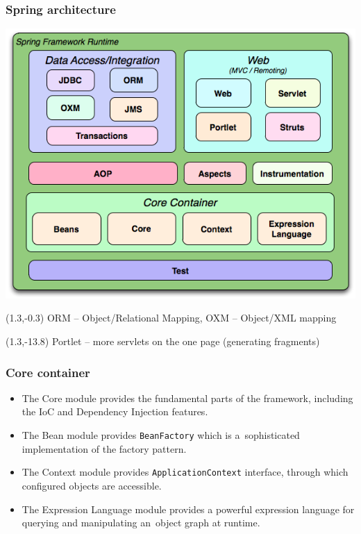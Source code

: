 \documentclass[10pt,xcolor=pdflatex, table]{beamer}
\begin{document}
\begin{frame}\frametitle{Spring architecture}
\begin{center}
  \includegraphics[scale=0.5]{img/obr1}
\end{center}
\begin{textblock}{15}(1.3,-0.3)
    {\footnotesize ORM -- Object/Relational Mapping, OXM -- Object/XML mapping}
\end{textblock}
\begin{textblock}{15}(1.3,-13.8)
    {\footnotesize Portlet -- more servlets on the one page (generating fragments)}
\end{textblock}
\end{frame}


\begin{frame}\frametitle{Core container}
	\begin{itemize}
		\item The Core module provides the fundamental parts of the framework, including the IoC and Dependency Injection features.
		\item The Bean module provides \texttt{BeanFactory} which is a~sophisticated implementation of the factory pattern.
		\item The Context module provides \texttt{ApplicationContext} interface, through which configured objects are accessible.
		\item The Expression Language module provides a powerful expression language for querying and manipulating an~object graph at runtime.
	\end{itemize}
\end{frame}
\end{document}
